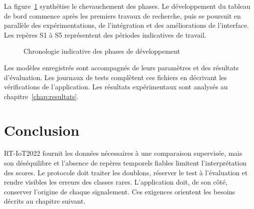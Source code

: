 La figure~\ref{fig:project-timeline} synth\'etise le chevauchement des phases.
Le d\'eveloppement du tableau de bord commence apr\`es les premiers travaux de
recherche, puis se poursuit en parall\`ele des exp\'erimentations, de
l'int\'egration et des am\'eliorations de l'interface. Les rep\`eres S1 \`a S5
repr\'esentent des p\'eriodes indicatives de travail.

\begin{figure}[!htbp]
  \centering
  
  \caption{Chronologie indicative des phases de d\'eveloppement}
  \label{fig:project-timeline}
\end{figure}

Les modèles enregistrés sont accompagnés de leurs paramètres et des résultats
d'évaluation. Les journaux de tests complètent ces fichiers en décrivant les
vérifications de l'application. Les résultats expérimentaux sont analysés au
chapitre~\ref{chap:resultats}.

\section{Conclusion}

RT-IoT2022 fournit les données nécessaires à une comparaison supervisée, mais
son déséquilibre et l'absence de repères temporels fiables limitent
l'interprétation des scores. Le protocole doit traiter les doublons, réserver
le test à l'évaluation et rendre visibles les erreurs des classes rares.
L'application doit, de son côté, conserver l'origine de chaque signalement.
Ces exigences orientent les besoins décrits au chapitre suivant.

